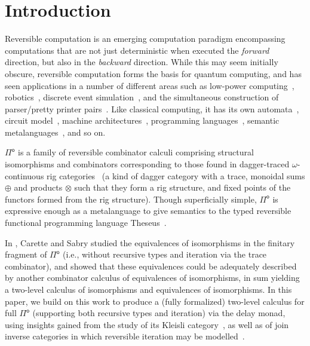 \documentclass[runningheads,a4paper]{llncs}
\newcommand{\Pio}{\ensuremath{\mathsf{\Pi}^{\mathsf{o}}}}
\begin{document}
\section{Introduction}\label{sec:intro}
Reversible computation is an emerging computation paradigm encompassing
computations that are not just deterministic when executed the \emph{forward}
direction, but also in the \emph{backward} direction. While this may seem
initially obscure, reversible computation forms the basis for quantum
computing, and has seen applications in a number of different areas such as
low-power computing~\cite{Landauer61}, robotics~\cite{SchultzLE18}, discrete
event simulation~\cite{Schordan15}, and the simultaneous construction of
parser/pretty printer pairs~\cite{RendelO10}. Like classical computing, it has
its own automata~\cite{Bennett73}, circuit model~\cite{DeVos10}, machine
architectures~\cite{ThomsenAG11}, programming
languages~\cite{JamesS12,JamesS14,YokoyamaG07,Schultz18,JacobsenKT18}, semantic
metalanguages~\cite{Giles,KaarsgaardAG17,KaarsgaardG18}, and so on.

\Pio{} is a family of reversible combinator calculi comprising structural
isomorphisms and combinators corresponding to those found in dagger-traced
$\omega$-continuous rig categories~\cite{Karvonen19} (a kind of dagger category
with a trace, monoidal sums $\oplus$ and products $\otimes$ such that they form
a rig structure, and fixed points of the functors formed from the rig
structure). Though superficially simple, \Pio{} is expressive enough as a
metalanguage to give semantics to the typed reversible functional programming
language Theseus~\cite{JamesS14}.

In \cite{CaretteS16}, Carette and Sabry studied the equivalences of 
isomorphisms in the finitary fragment of \Pio{} (i.e., without recursive types
and iteration via the trace combinator), and showed that these equivalences
could be adequately described by another combinator calculus of equivalences of
isomorphisms, in sum yielding a two-level calculus of isomorphisms and
equivalences of isomorphisms. In this paper, we build on this work to produce a
(fully formalized) two-level calculus for full \Pio{} (supporting both
recursive types and iteration) via the delay monad, using insights gained from
the study of its Kleisli category~\cite{UustaluV17,ChapmanUV19,VeltriPhD}, as
well as of join inverse categories in which reversible iteration may be
modelled~\cite{KaarsgaardAG17}.
\end{document}
